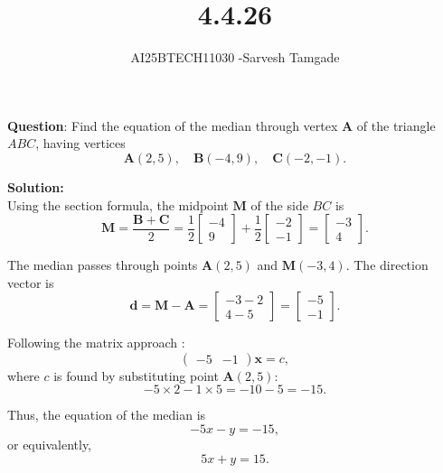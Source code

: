 \documentclass[journal]{IEEEtran}
\begin{document}

\vspace{3cm}

\title{4.4.26}
\author{AI25BTECH11030 -Sarvesh Tamgade}
{\let\newpage\relax\maketitle}

\renewcommand{\thefigure}{\theenumi}
\renewcommand{\thetable}{\theenumi}
\setlength{\intextsep}{10pt} 


\renewcommand{\thetable}{\theenumi}


\textbf{Question}: Find the equation of the median through vertex \(\mathbf{A}\) of the triangle \(ABC\), having vertices
\[
\mathbf{A}(2,5), \quad \mathbf{B}(-4,9), \quad \mathbf{C}(-2,-1).
\]

\textbf{Solution:}\\
Using the section formula, the midpoint \(\mathbf{M}\) of the side \(BC\) is 
\[
\mathbf{M} = \frac{\mathbf{B} + \mathbf{C}}{2} = 
\frac{1}{2} \begin{bmatrix} -4 \\ 9 \end{bmatrix} + 
\frac{1}{2} \begin{bmatrix} -2 \\ -1 \end{bmatrix} = 
\begin{bmatrix} -3 \\ 4 \end{bmatrix}.
\]

The median passes through points \(\mathbf{A}(2,5)\) and \(\mathbf{M}(-3,4)\). The direction vector is 
\[
\mathbf{d} = \mathbf{M} - \mathbf{A} = \begin{bmatrix} -3 - 2 \\ 4 - 5 \end{bmatrix} = \begin{bmatrix} -5 \\ -1 \end{bmatrix}.
\]

Following the matrix approach :
\[
\left( \begin{array}{cc} -5 & -1 \end{array} \right) \mathbf{x} = c,
\]
 where \(c\) is found by substituting point \(\mathbf{A}(2,5)\):
\[
-5 \times 2 - 1 \times 5 = -10 - 5 = -15.
\]

Thus, the equation of the median is
\[
-5 x - y = -15,
\]
or equivalently,
\[
5x + y = 15.
\]
\end{document}

